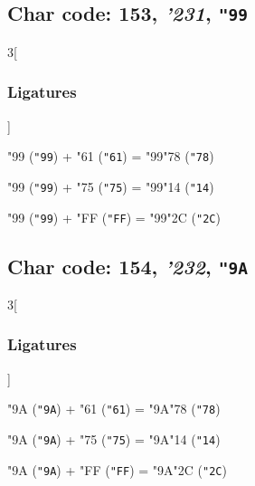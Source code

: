 \documentclass{article}
\newlength{\maxcharwidth}
\begin{document}
\subsection{Char code: 153, {\it'231}, {\tt"99}}
\label{char_153}


\begin{multicols}{3}[\subsubsection{Ligatures}]

{\testfont\char"99\noboundary} ({\tt"99}) + {\testfont\char"61\noboundary} ({\tt"61}) = {\testfont\char"99\noboundary}{\testfont\char"78\noboundary} ({\tt"78}) 

{\testfont\char"99\noboundary} ({\tt"99}) + {\testfont\char"75\noboundary} ({\tt"75}) = {\testfont\char"99\noboundary}{\testfont\char"14\noboundary} ({\tt"14}) 

{\testfont\char"99\noboundary} ({\tt"99}) + {\testfont\char"FF\noboundary} ({\tt"FF}) = {\testfont\char"99\noboundary}{\testfont\char"2C\noboundary} ({\tt"2C}) 

\end{multicols}

\subsection{Char code: 154, {\it'232}, {\tt"9A}}
\label{char_154}


\begin{multicols}{3}[\subsubsection{Ligatures}]

{\testfont\char"9A\noboundary} ({\tt"9A}) + {\testfont\char"61\noboundary} ({\tt"61}) = {\testfont\char"9A\noboundary}{\testfont\char"78\noboundary} ({\tt"78}) 

{\testfont\char"9A\noboundary} ({\tt"9A}) + {\testfont\char"75\noboundary} ({\tt"75}) = {\testfont\char"9A\noboundary}{\testfont\char"14\noboundary} ({\tt"14}) 

{\testfont\char"9A\noboundary} ({\tt"9A}) + {\testfont\char"FF\noboundary} ({\tt"FF}) = {\testfont\char"9A\noboundary}{\testfont\char"2C\noboundary} ({\tt"2C}) 

\end{multicols}
\end{document}
